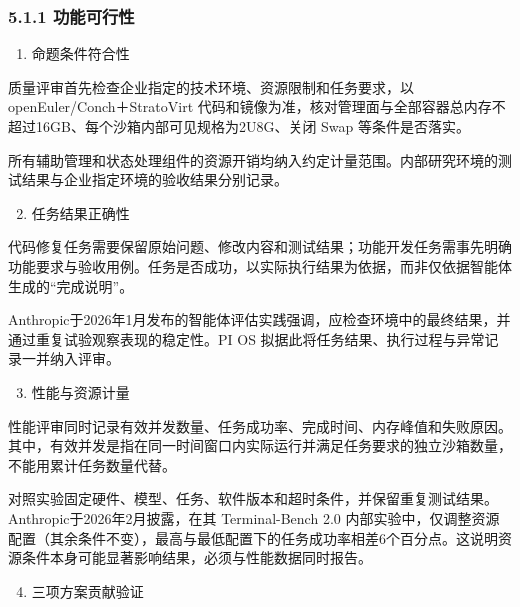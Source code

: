 \subsubsection{5.1.1 功能可行性}\label{ux529fux80fdux53efux884cux6027}

\begin{enumerate}

\item
  命题条件符合性
\end{enumerate}

质量评审首先检查企业指定的技术环境、资源限制和任务要求，以 openEuler/Conch＋StratoVirt 代码和镜像为准，核对管理面与全部容器总内存不超过16GB、每个沙箱内部可见规格为2U8G、关闭 Swap 等条件是否落实。

所有辅助管理和状态处理组件的资源开销均纳入约定计量范围。内部研究环境的测试结果与企业指定环境的验收结果分别记录。

\begin{enumerate}

\setcounter{enumi}{1}
\item
  任务结果正确性
\end{enumerate}

代码修复任务需要保留原始问题、修改内容和测试结果；功能开发任务需事先明确功能要求与验收用例。任务是否成功，以实际执行结果为依据，而非仅依据智能体生成的``完成说明''。

Anthropic于2026年1月发布的智能体评估实践强调，应检查环境中的最终结果，并通过重复试验观察表现的稳定性。PI OS 拟据此将任务结果、执行过程与异常记录一并纳入评审。

\begin{enumerate}

\setcounter{enumi}{2}
\item
  性能与资源计量
\end{enumerate}

性能评审同时记录有效并发数量、任务成功率、完成时间、内存峰值和失败原因。其中，有效并发是指在同一时间窗口内实际运行并满足任务要求的独立沙箱数量，不能用累计任务数量代替。

对照实验固定硬件、模型、任务、软件版本和超时条件，并保留重复测试结果。Anthropic于2026年2月披露，在其 Terminal-Bench 2.0 内部实验中，仅调整资源配置（其余条件不变），最高与最低配置下的任务成功率相差6个百分点。这说明资源条件本身可能显著影响结果，必须与性能数据同时报告。

\begin{enumerate}

\setcounter{enumi}{3}
\item
  三项方案贡献验证
\end{enumerate}


